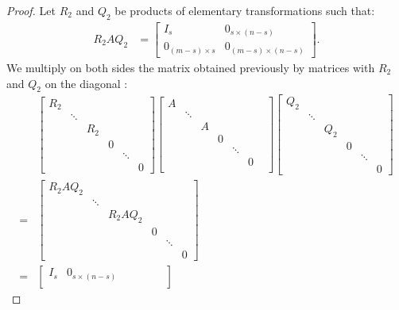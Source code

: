 \documentclass[11pt]{article}
\begin{document}
\begin{proof}
Let $R_2$ and $Q_2$ be products of elementary transformations such that:
\begin{align*}
    R_2AQ_2 &=\begin{bmatrix}
    I_s & 0_{s\times(n-s)}\\
    0_{(m-s)\times s} & 0_{(m-s)\times (n-s)}
    \end{bmatrix}.
\end{align*}
We multiply on both sides the matrix obtained previously by matrices with $R_2$ and $Q_2$ on the diagonal :
\begin{align*}
    &\begin{bmatrix}
    R_2 & & & & & \\
    & \ddots & & & & \\
    & & R_2 & & &\\
    & & & 0 & &\\
    & & & & \ddots &\\
    & & & & & 0
    \end{bmatrix}
    \begin{bmatrix}
    A & & & & & &\\
    & \ddots & & & &\\
    & & A & & & &\\
    & & & 0 & & \\
    & & & & \ddots &\\
    & & & & & 0\\
    \end{bmatrix}
    \begin{bmatrix}
    Q_2 & & & & & \\
    & \ddots & & & & \\
    & & Q_2 & & &\\
    & & & 0 & &\\
    & & & & \ddots &\\
    & & & & & 0
    \end{bmatrix}\\
    = &\begin{bmatrix}
    R_2AQ_2 & & & & & \\
    & \ddots & & & & \\
    & & R_2AQ_2 & & &\\
    & & & 0 & &\\
    & & & & \ddots &\\
    & & & & & 0    
    \end{bmatrix}\\
    = &\begin{bmatrix}
    I_s & 0_{s \times (n-s)} & & & & & \\

\end{bmatrix}
\end{align*}
\end{proof}
\end{document}
